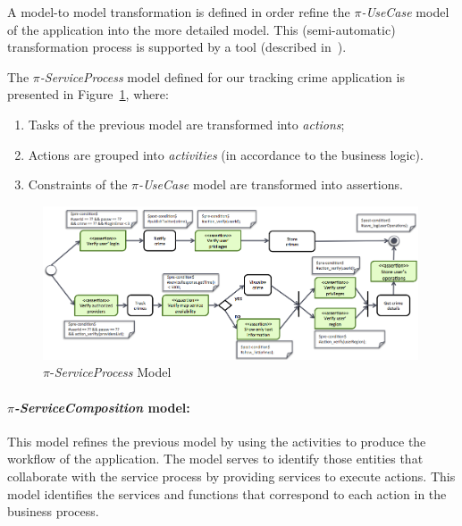 A model-to model transformation is defined in order refine the \textit{$\pi$-UseCase} model of the application into the more detailed model. 
This (semi-automatic) transformation process is supported by a tool (described in~\cite{SouzaNeto:2012}).

The \textit{$\pi$-ServiceProcess} model defined for our tracking crime application is presented in Figure~\ref{fig:piSP}, where: 
\begin{enumerate}
\item Tasks of the previous model are transformed into \textit{actions};
\item Actions are grouped into \textit{activities} (in accordance to the business logic).
\item Constraints of the \textit{$\pi$-UseCase} model are transformed into assertions.
\end{enumerate}

\begin{figure}[ht!]
\centering
\includegraphics[width=0.99\textwidth]{figs/piServiceProcess}
\caption{$\pi$-\textit{ServiceProcess} Model}
\label{fig:piSP}
\end{figure}

\paragraph*{\textit{$\pi$-ServiceComposition} model:} 
This model refines the previous model by using the activities to produce the workflow of the application.
The model serves to identify those entities that collaborate with the service process by providing services to execute actions. 
This model identifies the services and functions that correspond to each action in the business process.

